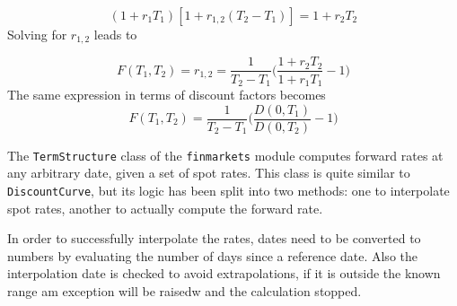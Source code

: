 \begin{equation}
(1+r_1 T_1)[1+r_{1,2}(T_2 - T_1)] = 1 + r_2 T_2
\label{eq:no_arbitrage_r}
\end{equation}
Solving for $r_{1,2}$ leads to

\begin{equation}
F(T_1, T_2) = r_{1,2} = \frac{1}{T_2 - T_1}\Big(\frac{1+r_2 T_2}{1+r_1 T_1} - 1 \Big)
\label{eq:forward_rate_simple}
\end{equation}
The same expression in terms of discount factors becomes
\begin{equation}
F(T_1, T_2) = \frac{1}{T_2 - T_1}\Big(\frac{D(0, T_1)}{D(0, T_2)} - 1 \Big)
\end{equation}

\begin{finmarkets}
The \texttt{TermStructure} class of the \texttt{finmarkets} module computes forward rates at any arbitrary date, given a set of spot rates. This class is quite similar to \texttt{DiscountCurve}, but its logic has been split into two methods: one to interpolate spot rates, another to actually compute the forward rate.

In order to successfully interpolate the rates, dates need to be converted to numbers by evaluating the number of days since a reference date. Also the interpolation date is checked to avoid extrapolations, if it is outside the known range am exception will be raisedw and the calculation stopped.
\end{finmarkets}

